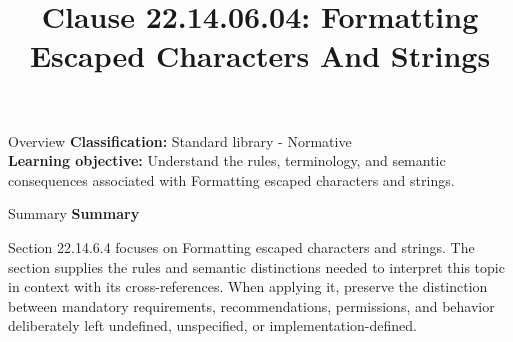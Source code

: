 \documentclass[10pt,letterpaper]{article}
\title{Clause 22.14.06.04: Formatting Escaped Characters And Strings}
\author{}
\date{}
\begin{document}
\maketitle
\begin{CornellOverviewBox}{Overview}
\textbf{Classification:} Standard library - Normative\\[2pt]
\textbf{Learning objective:} Understand the rules, terminology, and semantic consequences associated with Formatting escaped characters and strings.
\end{CornellOverviewBox}\begin{CornellSummaryBox}{Summary}
{\sffamily\bfseries\color{Accent} Summary}\par\vspace{3pt}Section 22.14.6.4 focuses on Formatting escaped characters and strings. The section supplies the rules and semantic distinctions needed to interpret this topic in context with its cross-references. When applying it, preserve the distinction between mandatory requirements, recommendations, permissions, and behavior deliberately left undefined, unspecified, or implementation-defined.
\end{CornellSummaryBox}
\end{document}
